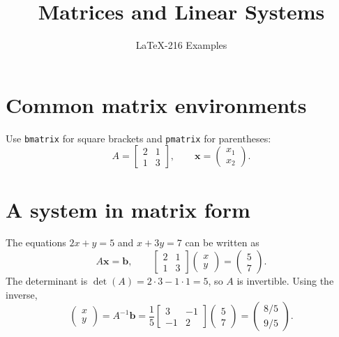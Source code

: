 \documentclass{article}
\title{Matrices and Linear Systems}
\author{LaTeX-216 Examples}
\date{}
\begin{document}
\maketitle

\section{Common matrix environments}
Use \texttt{bmatrix} for square brackets and \texttt{pmatrix} for parentheses:
\[
  A = \begin{bmatrix}
    2 & 1 \\
    1 & 3
  \end{bmatrix},
  \qquad
  \mathbf{x} = \begin{pmatrix}x_1 \\ x_2\end{pmatrix}.
\]

\section{A system in matrix form}
The equations $2x+y=5$ and $x+3y=7$ can be written as
\[
  A\mathbf{x}=\mathbf{b}, \qquad
  \begin{bmatrix}2&1\\1&3\end{bmatrix}
  \begin{pmatrix}x\\y\end{pmatrix}
  =
  \begin{pmatrix}5\\7\end{pmatrix}.
\]
The determinant is $\det(A)=2\cdot3-1\cdot1=5$, so $A$ is invertible.
Using the inverse,
\[
  \begin{pmatrix}x\\y\end{pmatrix}
  = A^{-1}\mathbf{b}
  = \frac{1}{5}
    \begin{bmatrix}3&-1\\-1&2\end{bmatrix}
    \begin{pmatrix}5\\7\end{pmatrix}
  = \begin{pmatrix}8/5\\9/5\end{pmatrix}.
\]
\end{document}
